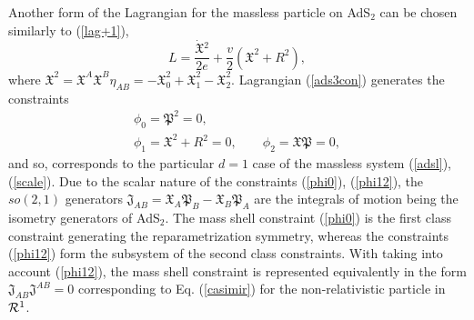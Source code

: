 \documentclass[a4paper,12pt]{article}
\def\X{\mathfrak X}
\def\P{\mathfrak P}
\def\J{\mathfrak J}
\begin{document}
Another form of the Lagrangian for the massless particle
on AdS${}_2$ can be chosen
similarly to (\ref{lag+1}),
\begin{equation}
L=\frac{\dot{\X}{}^2}{2e}+
\frac{v}{2}(\X^2 +R^2),
\label{ads3con}
\end{equation}
where
$\X^2=\X^A\X^B\eta_{AB}=
-\X_0^2+\X_1^2-\X_2^2$.
Lagrangian (\ref{ads3con})
generates the constraints
\begin{eqnarray}
&\phi_0=\P^2=0,&\label{phi0}\\
&\phi_1=\X^2+R^2=0,\qquad
\phi_2=\X\P=0,&
\label{phi12}
\end{eqnarray}
and so, corresponds to the particular $d=1$ case
of the massless system (\ref{adsl}), (\ref{scale}).
Due to the scalar nature of the constraints
(\ref{phi0}), (\ref{phi12}),
the $so(2,1)$ generators
$\J_{AB}=\X_A\P_B-\X_B\P_A$
are the integrals of motion being
the isometry generators of AdS${}_2$.
The mass shell constraint (\ref{phi0})
is the first class constraint
generating the reparametrization symmetry,
whereas the constraints (\ref{phi12})
form the subsystem of the second class constraints.
With taking into account
(\ref{phi12}), the mass shell constraint
is represented equivalently in the form
$\J_{AB}\J^{AB}=0$ corresponding to Eq. (\ref{casimir})
for the non-relativistic particle
in ${\cal R}^1$.
\end{document}

